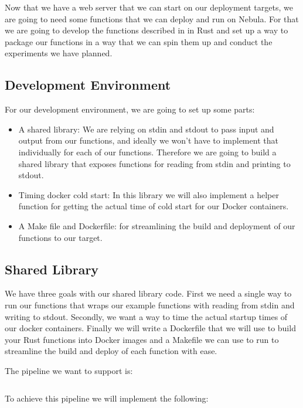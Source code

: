 \documentclass[
  table]{report}
\providecommand{\tightlist}{%
  \setlength{\itemsep}{0pt}\setlength{\parskip}{0pt}}
\begin{document}
Now that we have a web server that we can start on our deployment
targets, we are going to need some functions that we can deploy and run
on Nebula. For that we are going to develop the functions described in
 in Rust and set up a way to package our
functions in a way that we can spin them up and conduct the experiments
we have planned.

\subsection{Development Environment}

For our development environment, we are going to set up some parts:

\begin{itemize}
\tightlist
\item
  A shared library: We are relying on stdin and stdout to pass input and
  output from our functions, and ideally we won't have to implement that
  individually for each of our functions. Therefore we are going to
  build a shared library that exposes functions for reading from stdin
  and printing to stdout.
\item
  Timing docker cold start: In this library we will also implement a
  helper function for getting the actual time of cold start for our
  Docker containers.
\item
  A Make file and Dockerfile: for streamlining the build and deployment
  of our functions to our target.
\end{itemize}

\subsection{Shared Library}
\label{sect:shared_lib}

We have three goals with our shared library code. First we need a single
way to run our functions that wraps our example functions with reading
from stdin and writing to stdout. Secondly, we want a way to time the
actual startup times of our docker containers. Finally we will write a
Dockerfile that we will use to build your Rust functions into Docker
images and a Makefile we can use to run to streamline the build and
deploy of each function with ease.

The pipeline we want to support is:

\inputminted[firstline=6, lastline=9]{bash}{assets/code/commands.sh}

To achieve this pipeline we will implement the following:
\end{document}
